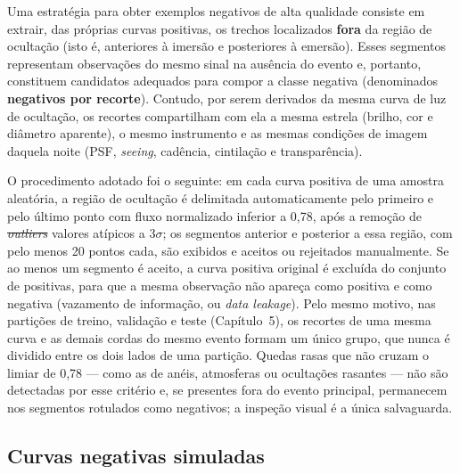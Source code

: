 \documentclass[msc]{on} %
\makeatletter
\providecommand{\DIFaddtex}[1]{{\protect\color{red}#1}} %
\providecommand{\DIFdeltex}[1]{{\protect\color{red}\sout{#1}}} %
\providecommand{\DIFaddbegin}{} %
\providecommand{\DIFaddend}{} %
\providecommand{\DIFdelbegin}{} %
\providecommand{\DIFdelend}{} %
\providecommand{\DIFadd}[1]{\texorpdfstring{\DIFaddtex{#1}}{#1}} %
\providecommand{\DIFdel}[1]{\texorpdfstring{\DIFdeltex{#1}}{}} %
\let\sout@orig\sout %
\renewcommand{\sout}[1]{\ifmmode\text{\sout@orig{\ensuremath{#1}}}\else\sout@orig{#1}\fi} %
\makeatother
\begin{document}
Uma estratégia para obter exemplos negativos de alta qualidade consiste em extrair, das próprias curvas positivas, os trechos localizados \textbf{fora} da região de ocultação (isto é, anteriores à imersão e posteriores à emersão). Esses segmentos representam observações do mesmo sinal na ausência do evento e, portanto, constituem candidatos adequados para compor a classe negativa (denominados \textbf{negativos por recorte}). Contudo, por serem derivados da mesma curva de luz de ocultação, os recortes compartilham com ela a mesma estrela (brilho, cor e diâmetro aparente), o mesmo instrumento e as mesmas condições de imagem daquela noite (PSF, \textit{seeing}, cadência, cintilação e transparência).

O procedimento adotado foi o seguinte: em cada curva positiva de uma amostra aleatória, a região de ocultação é delimitada automaticamente pelo primeiro e pelo último ponto com fluxo normalizado inferior a 0,78, após a remoção de \DIFdelbegin \textit{\DIFdel{outliers}} %
\DIFdelend\ifhmode\hskip0pt\fi \DIFaddbegin \DIFadd{valores atípicos }\DIFaddend a \(3\sigma\); os segmentos anterior e posterior a essa região, com pelo menos 20 pontos cada, são exibidos e aceitos ou rejeitados manualmente. Se ao menos um segmento é aceito, a curva positiva original é excluída do conjunto de positivas, para que a mesma observação não apareça como positiva e como negativa (vazamento de informação, ou \textit{data leakage}). \DIFaddbegin \DIFadd{Pelo mesmo motivo, nas partições de treino, validação e teste (Capítulo~5), os recortes de uma mesma curva e as demais cordas do mesmo evento formam um único grupo, que nunca é dividido entre os dois lados de uma partição. Quedas rasas que não cruzam o limiar de 0,78 --- como as de anéis, atmosferas ou ocultações rasantes --- não são detectadas por esse critério e, se presentes fora do evento principal, permanecem nos segmentos rotulados como negativos; a inspeção visual é a única salvaguarda.
}\DIFaddend 

\subsection{Curvas negativas simuladas}
\end{document}
